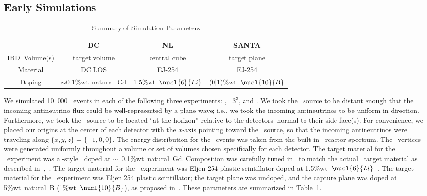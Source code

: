 \subsection{\label{subsec:esim}Early Simulations}

\begin{table}[ht]
  \begin{tabular}{ c || c | c | c }
    \textbf{~} & \textbf{DC} & \textbf{NL} & \textbf{SANTA} \\ %
    \hline \hline
    IBD~Volume(s) & target volume & central cube & target plane \\ \hline
    Material & DC LOS & EJ-254 & EJ-254 \\ \hline
    Doping & $\sim$0.1\%wt~natural~Gd & 1.5\%wt~$\nucl{6}{Li}$ & (0|1)\%wt~$\nucl{10}{B}$ \\
  \end{tabular}
  \caption{Summary of Simulation Parameters}
  \label{tab:comp_params}
\end{table}

We simulated 10~000 \ibd\ events in each of the following three experiments: \dc, \nl\ $3^3$, and \santa.
We took the \nb\ source to be distant enough that the incoming antineutrino flux could be well-represented by a plane wave; i.e., we took the incoming antineutrinos to be uniform in direction.
Furthermore, we took the \nb\ source to be located ``at the horizon'' relative to the detectors, normal to their side face(s).
For convenience, we placed our origins at the center of each detector with the $x$-axis pointing toward the \nb\ source, so that the incoming antineutrinos were traveling along $\{x,y,z\} = \{-1,0,0\}$.
The energy distribution for the \ibd\ events was taken from the built-in \rat\ reactor spectrum. %
The \ibd\ vertices were generated uniformly throughout a volume or set of volumes chosen specifically for each detector.
The target material for the \dc\ experiment was a \dc-style \ols\ doped at $\sim$~0.1\%wt~natural~Gd. Composition was carefully tuned in \rat\ to match the actual \dc\ target material as described in~\cite{2012JInst},~\cite{Caden:2012aap}.
The target material for the \nl\ experiment was Eljen 254 plastic scintillator doped at 1.5\%wt~$\nucl{6}{Li}$~\cite{Eljen}.
The target material for the \santa\ experiment was Eljen 254 plastic scintillator; the target plane was undoped, and the capture plane was doped at 5\%wt~natural~B (1\%wt~$\nucl{10}{B}$), as proposed in~\cite{Safdi:2014hwa}.
These parameters are summarized in Table~\ref{tab:comp_params}.

